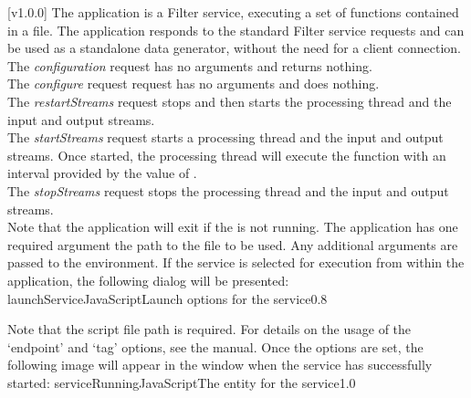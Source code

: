 [v1.0.0]
The  application is a Filter service, executing a set
of \JS{} functions contained in a file.
The application responds to the standard Filter service requests and can be used as a
standalone data generator, without the need for a client connection.\\

The \emph{configuration} request has no arguments and returns nothing.\\

The \emph{configure} request request has no arguments and does nothing.\\

The \emph{restartStreams} request stops and then starts the processing thread and the
input and output streams.\\

The \emph{startStreams} request starts a processing thread and the input and output
streams.
Once started, the processing thread will execute the  function with
an interval provided by the value of .\\

The \emph{stopStreams} request stops the processing thread and the input and output
streams.\\ 

Note that the application will exit if the \emph{\RS} is not running.
The application has one required argument \longDash{} the path to the \JS{} file to be
used.
Any additional arguments are passed to the \JS{} environment.
\insertAppParameters
\insertTagDescription{\JSF}
\insertFilterServiceComment
\condPage
\insertStandardServiceCommands
\secondaryEnd
\condPage
{}
If the service is selected for execution from within the \emph{\MMMU} application, the
following dialog will be presented:
%
{launchServiceJavaScript}{Launch options for the \emph{\JSF} service}{0.8}

Note that the script file path is required.
For details on the usage of the `endpoint' and `tag' options, see the \emph{\MMMU} manual.
Once the options are set, the following image will appear in the \emph{\MMMU} window when
the service has successfully started:
%
{serviceRunningJavaScript}{The \emph{\MMMU} entity for the \emph{\JSF} service}{1.0}


